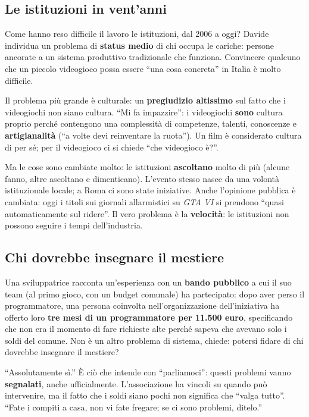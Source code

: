 \subsection{Le istituzioni in vent'anni}

Come hanno reso difficile il lavoro le istituzioni, dal 2006 a oggi? Davide
individua un problema di \textbf{status medio} di chi occupa le cariche: persone
ancorate a un sistema produttivo tradizionale che funziona. Convincere qualcuno
che un piccolo videogioco possa essere ``una cosa concreta'' in Italia è molto
difficile.

Il problema più grande è culturale: un \textbf{pregiudizio altissimo} sul fatto che
i videogiochi non siano cultura. ``Mi fa impazzire'': i videogiochi \textbf{sono}
cultura proprio perché contengono una complessità di competenze, talenti,
conoscenze e \textbf{artigianalità} (``a volte devi reinventare la ruota''). Un
film è considerato cultura di per sé; per il videogioco ci si chiede ``che
videogioco è?''.

Ma le cose sono cambiate molto: le istituzioni \textbf{ascoltano} molto di più
(alcune fanno, altre ascoltano e dimenticano). L'evento stesso nasce da una
volontà istituzionale locale; a Roma ci sono state iniziative. Anche l'opinione
pubblica è cambiata: oggi i titoli sui giornali allarmistici su \emph{GTA VI} si
prendono ``quasi automaticamente sul ridere''. Il vero problema è la
\textbf{velocità}: le istituzioni non possono seguire i tempi dell'industria.

\subsection{Chi dovrebbe insegnare il mestiere}

Una sviluppatrice racconta un'esperienza con un \textbf{bando pubblico} a cui il suo
team (al primo gioco, con un budget comunale) ha partecipato: dopo aver perso il
programmatore, una persona coinvolta nell'organizzazione dell'iniziativa ha offerto
loro \textbf{tre mesi di un programmatore per 11.500 euro}, specificando che non era
il momento di fare richieste alte perché sapeva che avevano solo i soldi del comune.
Non è un altro problema di sistema, chiede: potersi fidare di chi dovrebbe insegnare
il mestiere?

``Assolutamente sì.'' È ciò che intende con ``parliamoci'': questi problemi vanno
\textbf{segnalati}, anche ufficialmente. L'associazione ha vincoli su quando può
intervenire, ma il fatto che i soldi siano pochi non significa che ``valga
tutto''. ``Fate i compiti a casa, non vi fate fregare; se ci sono problemi,
ditelo.''

